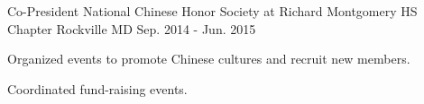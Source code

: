 

\begin{cventries}

  \cventry
    {Co-President} %
    {National Chinese Honor Society at Richard Montgomery HS Chapter} %
    {Rockville MD} %
    {Sep. 2014 - Jun. 2015} %
    {
      \begin{cvitems} %
        \item {Organized events to promote Chinese cultures and recruit new members.}
        \item {Coordinated fund-raising events.}
      \end{cvitems}
    }
\end{cventries}
